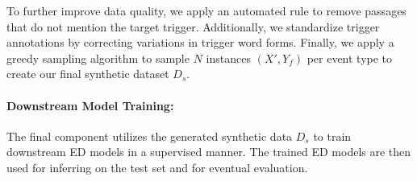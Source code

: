 To further improve data quality, we apply an automated rule to remove passages that do not mention the target trigger.
Additionally, we standardize trigger annotations by correcting variations in trigger word forms.
Finally, we apply a greedy sampling algorithm to sample $N$ instances $(X', Y_f)$ per event type to create our final synthetic dataset $D_s$.

\paragraph{Downstream Model Training:}
The final component utilizes the generated synthetic data $D_s$ to train downstream ED models in a supervised manner.
The trained ED models are then used for inferring on the test set and for eventual evaluation.

